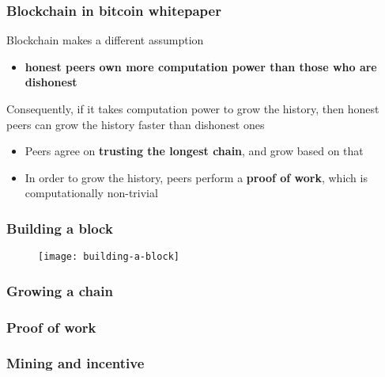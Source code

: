 \documentclass{beamer}
\begin{document}
\begin{frame}
\frametitle{Blockchain in bitcoin whitepaper}

Blockchain makes a different assumption
\begin{itemize}
    \item \textbf{honest peers own more computation power than those who are dishonest}
\end{itemize}

\vspace{0.2in}

Consequently, if it takes computation power to grow the history, then honest peers can grow the history faster than dishonest ones
\begin{itemize}
    \item Peers agree on \textbf{trusting the longest chain}, and grow based on that
    \item In order to grow the history, peers perform a \textbf{proof of work}, which is computationally non-trivial
\end{itemize}

\end{frame}

\begin{frame}
\frametitle{Building a block}

\begin{figure}
  \centering
  \texttt{[image: building-a-block]}
\end{figure}

\end{frame}

\begin{frame}
\frametitle{Growing a chain}

\end{frame}

\begin{frame}
\frametitle{Proof of work}

\end{frame}

\begin{frame}
\frametitle{Mining and incentive}

\end{frame}
\end{document}
